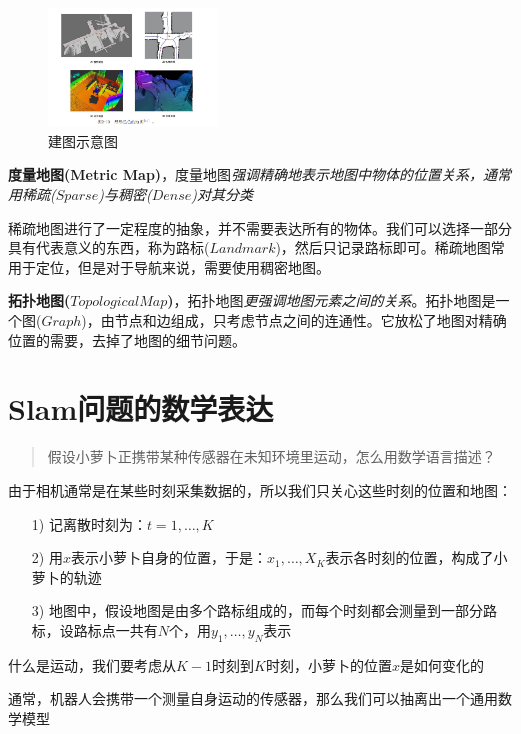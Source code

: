 \begin{figure}[!htbp]
    \centering
    \includegraphics[width=0.4\textwidth]{image/chapter01/建图示意.png}
    \caption{建图示意图}    
\end{figure}

    \textbf{度量地图(Metric Map)}，度量地图\emph{强调精确地表示地图中物体的位置关系，通常用稀疏($Sparse$)与稠密($Dense$)对其分类}

    稀疏地图进行了一定程度的抽象，并不需要表达所有的物体。我们可以选择一部分具有代表意义的东西，称为路标($Landmark$)，然后只记录路标即可。稀疏地图常用于定位，但是对于导航来说，需要使用稠密地图。

    \textbf{拓扑地图($Topological Map$)}，拓扑地图\emph{更强调地图元素之间的关系}。拓扑地图是一个图($Graph$)，由节点和边组成，只考虑节点之间的连通性。它放松了地图对精确位置的需要，去掉了地图的细节问题。

\section{Slam问题的数学表达}

\begin{quote}
    \centering
    假设小萝卜正携带某种传感器在未知环境里运动，怎么用数学语言描述？
\end{quote}

    由于相机通常是在某些时刻采集数据的，所以我们只关心这些时刻的位置和地图：
\begin{itemize}
    \item [1)] 记离散时刻为：$t = 1, \dots, K$
    \item [2)] 用$x$表示小萝卜自身的位置，于是：$x_1, \dots, X_K$表示各时刻的位置，构成了小萝卜的轨迹
    \item [3)] 地图中，假设地图是由多个路标组成的，而每个时刻都会测量到一部分路标，设路标点一共有$N$个，用$y_1, \dots, y_N$表示
\end{itemize}

    什么是运动，我们要考虑从$K - 1$时刻到$K$时刻，小萝卜的位置$x$是如何变化的

    通常，机器人会携带一个测量自身运动的传感器，那么我们可以抽离出一个通用数学模型

